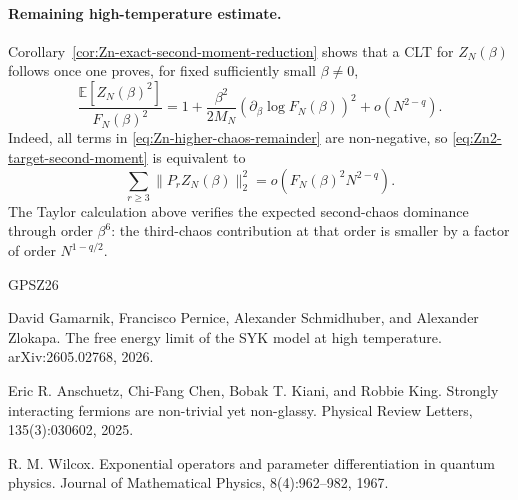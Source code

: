 \documentclass[11pt]{article}
\newcommand{\E}{\mathbb{E}}
\newcommand{\norm}[1]{\lVert #1\rVert}
\begin{document}
\paragraph{Remaining high-temperature estimate.}
Corollary~\ref{cor:Zn-exact-second-moment-reduction} shows that a CLT for
$Z_N(\beta)$ follows once one proves, for fixed sufficiently small
$\beta\neq0$,
\begin{equation}\label{eq:Zn2-target-second-moment}
  \frac{\E[Z_N(\beta)^2]}{F_N(\beta)^2}
  =
  1
  +
  \frac{\beta^2}{2M_N}
  \left(
    \partial_\beta\log F_N(\beta)
  \right)^2
  +
  o\left(N^{2-q}\right).
\end{equation}
Indeed, all terms in \eqref{eq:Zn-higher-chaos-remainder} are non-negative,
so \eqref{eq:Zn2-target-second-moment} is equivalent to
\begin{equation}\label{eq:Zn-higher-chaos-target}
  \sum_{r\geq3}\norm{P_rZ_N(\beta)}_2^2
  =
  o\left(F_N(\beta)^2N^{2-q}\right).
\end{equation}
The Taylor calculation above verifies the expected second-chaos dominance
through order $\beta^6$: the third-chaos contribution at that order is smaller
by a factor of order $N^{1-q/2}$.

\begin{thebibliography}{GPSZ26}

David Gamarnik, Francisco Pernice, Alexander Schmidhuber, and Alexander
Zlokapa.
\newblock The free energy limit of the {SYK} model at high temperature.
\newblock arXiv:2605.02768, 2026.

Eric R. Anschuetz, Chi-Fang Chen, Bobak T. Kiani, and Robbie King.
\newblock Strongly interacting fermions are non-trivial yet non-glassy.
\newblock Physical Review Letters, 135(3):030602, 2025.

R. M. Wilcox.
\newblock Exponential operators and parameter differentiation in quantum physics.
\newblock Journal of Mathematical Physics, 8(4):962--982, 1967.

\end{thebibliography}
\end{document}
